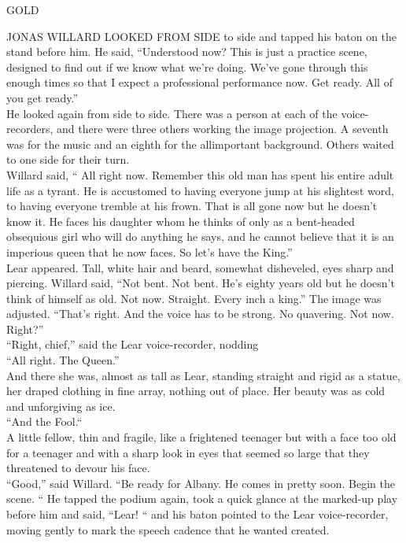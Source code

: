 \documentclass[a4paper,12pt]{article}
\begin{document}
\begin{centering}
GOLD\\
\end{centering}
JONAS WILLARD LOOKED FROM SIDE to side and tapped his baton on the stand before him.
He said, “Understood now? This is just a practice scene, designed to find out if we know what
we’re doing. We’ve gone through this enough times so that I expect a professional performance now. Get
ready. All of you get ready.”\\
He looked again from side to side. There was a person at each of the voice-recorders, and there
were three others working the image projection. A seventh was for the music and an eighth for the allimportant
background. Others waited to one side for their turn.\\
Willard said, “ All right now. Remember this old man has spent his entire adult life as a tyrant. He
is accustomed to having everyone jump at his slightest word, to having everyone tremble at his frown. That
is all gone now but he doesn’t know it. He faces his daughter whom he thinks of only as a bent-headed
obsequious girl who will do anything he says, and he cannot believe that it is an imperious queen that he
now faces. So let’s have the King.”\\
Lear appeared. Tall, white hair and beard, somewhat disheveled, eyes sharp and piercing.
Willard said, “Not bent. Not bent. He's eighty years old but he doesn't think of himself as old. Not
now. Straight. Every inch a king.” The image was adjusted. “That's right. And the voice has to be strong.
No quavering. Not now. Right?”\\
“Right, chief,” said the Lear voice-recorder, nodding\\
“All right. The Queen.”\\
And there she was, almost as tall as Lear, standing straight and rigid as a statue, her draped
clothing in fine array, nothing out of place. Her beauty was as cold and unforgiving as ice.\\
“And the Fool.“\\
A little fellow, thin and fragile, like a frightened teenager but with a face too old for a teenager and
with a sharp look in eyes that seemed so large that they threatened to devour his face.\\
“Good,” said Willard. “Be ready for Albany. He comes in pretty soon. Begin the scene. “ He
tapped the podium again, took a quick glance at the marked-up play before him and said, “Lear! “ and his
baton pointed to the Lear voice-recorder, moving gently to mark the speech cadence that he wanted created.
\end{document}
